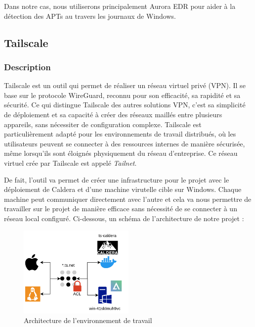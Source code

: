 \documentclass[12pt,letterpaper]{article}
\begin{document}
Dans notre cas, nous utiliserons principalement Aurora EDR pour aider à la détection des APTs au travers les journaux de Windows.

\subsection{Tailscale}

\subsubsection{Description}

Tailscale est un outil qui permet de réaliser un réseau virtuel privé (VPN).
Il se base sur le protocole WireGuard, reconnu pour son efficacité, sa rapidité et sa sécurité.
Ce qui distingue Tailscale des autres solutions VPN, c'est sa simplicité de déploiement et sa capacité à créer des réseaux maillés entre plusieurs appareils, sans nécessiter de configuration complexe.
Tailscale est particulièrement adapté pour les environnements de travail distribués, où les utilisateurs peuvent se connecter à des ressources internes de manière sécurisée, même lorsqu'ils sont éloignés physiquement du réseau d'entreprise.
Ce réseau virtuel crée par Tailscale est appelé \textit{Tailnet}.

\bigskip

De fait, l'outil va permet de créer une infrastructure pour le projet avec le déploiement de Caldera et d'une machine virutelle cible sur Windows.
Chaque machine peut communiquer directement avec l'autre et cela va nous permettre de travailler sur le projet de manière efficace sans nécessité de se connecter à un réseau local configuré.
Ci-dessous, un schéma de l'architecture de notre projet :
\begin{figure}[!h]
    \centering
    \includegraphics[width=0.5\textwidth]{images/infra_scheme.png}
    \caption{Architecture de l'environnement de travail}
    \label{fig:architecture}
\end{figure}
\end{document}
